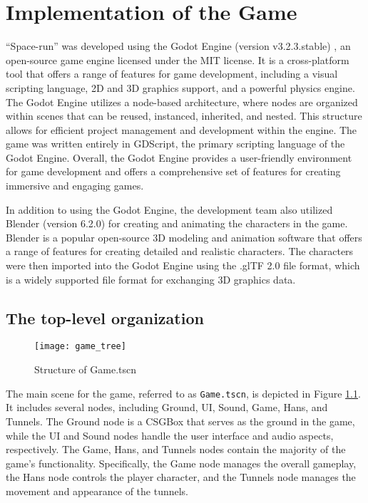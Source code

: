 \chapter{Implementation of the Game}
``Space-run'' was developed using the Godot Engine (version v3.2.3.stable) , an open-source game engine licensed under the MIT license. It is a cross-platform tool that offers a range of features for game development, including a visual scripting language, 2D and 3D graphics support, and a powerful physics engine. The Godot Engine utilizes a node-based architecture, where nodes are organized within scenes that can be reused, instanced, inherited, and nested. This structure allows for efficient project management and development within the engine. The game was written entirely in GDScript, the primary scripting language of the Godot Engine. Overall, the Godot Engine provides a user-friendly environment for game development and offers a comprehensive set of features for creating immersive and engaging games.

In addition to using the Godot Engine, the development team also utilized Blender (version 6.2.0) for creating and animating the characters in the game. Blender is a popular open-source 3D modeling and animation software that offers a range of features for creating detailed and realistic characters. The characters were then imported into the Godot Engine using the .glTF 2.0 file format, which is a widely supported file format for exchanging 3D graphics data.

\section{The top-level organization}
\begin{figure}[h]
    \centering
    \texttt{[image: game\_tree]}
    \caption{Structure of Game.tscn}
    \label{fig:game_tree}
\end{figure}

The main scene for the game, referred to as \texttt{Game.tscn}, is depicted in Figure \ref{fig:game_tree}. It includes several nodes, including Ground, UI, Sound, Game, Hans, and Tunnels. The Ground node is a CSGBox that serves as the ground in the game, while the UI and Sound nodes handle the user interface and audio aspects, respectively. The Game, Hans, and Tunnels nodes contain the majority of the game's functionality. Specifically, the Game node manages the overall gameplay, the Hans node controls the player character, and the Tunnels node manages the movement and appearance of the tunnels.

